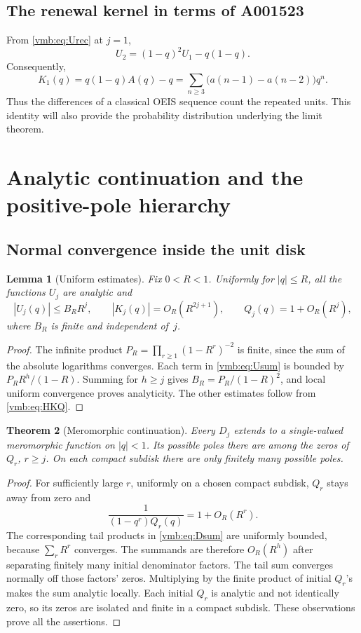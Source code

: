 \documentclass[11pt,a4paper]{article}
\numberwithin{equation}{section}
\newtheorem{theorem}{Theorem}[section]
\newtheorem{lemma}[theorem]{Lemma}
\theoremstyle{definition}\newtheorem{definition}[theorem]{Definition}
\theoremstyle{remark}\newtheorem{remark}[theorem]{Remark}
\begin{document}
\subsection{The renewal kernel in terms of A001523}
From \eqref{vmb:eq:Urec} at \(j=1\),
\[
U_2=(1-q)^2U_1-q(1-q).
\]
Consequently,
\begin{equation}\label{vmb:eq:K-A}
K_1(q)=q(1-q)A(q)-q
      =\sum_{n\geq3}\bigl(a(n-1)-a(n-2)\bigr)q^n.
\end{equation}
Thus the differences of a classical OEIS sequence count the repeated
units. This identity will also provide the probability distribution
underlying the limit theorem.

\section{Analytic continuation and the positive-pole hierarchy}

\subsection{Normal convergence inside the unit disk}
\begin{lemma}[Uniform estimates]\label{vmb:lem:bounds}
Fix \(0<R<1\). Uniformly for \(|q|\leq R\), all the functions \(U_j\)
are analytic and
\begin{equation}\label{vmb:eq:Ubound}
|U_j(q)|\leq B_R R^j,
\qquad |K_j(q)|=O_R(R^{2j+1}),
\qquad Q_j(q)=1+O_R(R^j),
\end{equation}
where \(B_R\) is finite and independent of~\(j\).
\end{lemma}
\begin{proof}
The infinite product
\(P_R=\prod_{r\geq1}(1-R^r)^{-2}\) is finite, since the sum of the
absolute logarithms converges. Each term in \eqref{vmb:eq:Usum} is bounded
by \(P_R R^h/(1-R)\). Summing for \(h\geq j\) gives
\(B_R=P_R/(1-R)^2\), and local uniform convergence proves analyticity.
The other estimates follow from \eqref{vmb:eq:HKQ}.
\end{proof}

\begin{theorem}[Meromorphic continuation]\label{vmb:thm:meromorphic}
Every \(D_j\) extends to a single-valued meromorphic function on
\(|q|<1\). Its possible poles there are among the zeros of
\(Q_r\), \(r\geq j\). On each compact subdisk there are only finitely
many possible poles.
\end{theorem}
\begin{proof}
For sufficiently large \(r\), uniformly on a chosen compact subdisk,
\(Q_r\) stays away from zero and
\[
\frac{1}{(1-q^r)Q_r(q)}=1+O_R(R^r).
\]
The corresponding tail products in \eqref{vmb:eq:Dsum} are uniformly
bounded, because \(\sum_rR^r\) converges. The summands are therefore
\(O_R(R^h)\) after separating finitely many initial denominator factors.
The tail sum converges normally off those factors' zeros. Multiplying by
the finite product of initial \(Q_r\)'s makes the sum analytic locally.
Each initial \(Q_r\) is analytic and not identically zero, so its zeros
are isolated and finite in a compact subdisk. These observations prove
all the assertions.
\end{proof}
\end{document}
